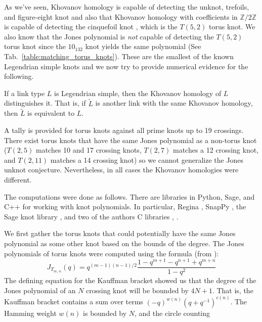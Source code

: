 As we've seen, Khovanov homology is capable of detecting the
unknot, trefoils, and figure-eight knot and also that Khovanov homology with
coefficients in $\mathbb{Z}/2\mathbb{Z}$ is capable of detecting
the cinquefoil knot \cite{BaldwinYingSivekCinquefoilKhovanov},
which is the $T(5,2)$ torus knot. We also know that the Jones
polynomial is \textit{not} capable of detecting the
$T(5,2)$ torus knot since the $10_{132}$ knot yields the same
polynomial (See Tab.~\ref{table:matching_torus_knots}).
These are the smallest of the known Legendrian simple knots
and we now try to provide numerical evidence for the following.
\begin{conjecture}
    If a link type $L$ is Legendrian simple, then the Khovanov homology
    of $L$ distinguishes it. That is, if $\tilde{L}$
    is another link with the same Khovanov homology, then $\tilde{L}$ is
    equivalent to $L$.
\end{conjecture}
A tally is provided for torus knots against all prime knots up to 19 crossings.
There exist torus knots that have the same Jones polynomial as a non-torus
knot ($T(2,5)$ matches 10 and 17 crossing knots, $T(2,7)$
matches a 12 crossing knot, and $T(2,11)$ matches a 14 crossing knot)
so we cannot generalize the Jones unknot conjecture. Nevertheless, in
all cases the Khovanov homologies were different.
\par\hfill\par
The computations were done as follows. There are libraries in Python,
Sage, and C++ for working with knot polynomials. In particular,
Regina \cite{regina}, SnapPy \cite{SnapPy}, the Sage knot library
\cite{sage}, and two of the authors C libraries
\cite{MaguireJones}, \cite{MaguireLibtmpl}.
\par\hfill\par
We first gather the torus knots that could potentially have the same
Jones polynomial as some other knot based on the bounds of the degree.
The Jones polynomials of torus knots were computed using the
formula (from \cite{jonesfordummyvjones}):
\begin{equation}
    \label{eqn:jones_poly_torus}%
    J_{T_{m,\,n}}(q)=q^{(m-1)(n-1)/2}
        \frac{1-q^{m+1}-q^{n+1}+q^{m+n}}{1-q^{2}}
\end{equation}
The defining equation for the Kauffman bracket showed us that the degree of the
Jones polynomial of an $N$ crossing knot will be bounded by $4N+1$. That is,
the Kauffman bracket contains a sum over terms $(-q)^{w(n)}(q+q^{-1})^{c(n)}$.
The Hamming weight $w(n)$ is bounded by $N$, and the circle counting
